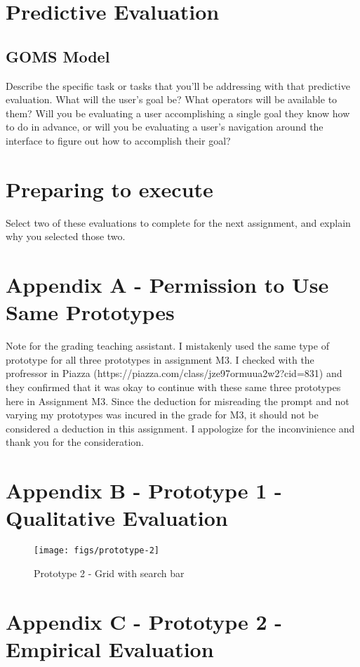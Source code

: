 \section{Predictive Evaluation}

\subsection{GOMS Model}
Describe the specific task or tasks that you’ll be addressing with that predictive evaluation. What will the user’s goal be? What operators will be available to them? Will you be evaluating a user accomplishing a single goal they know how to do in advance, or will you be evaluating a user’s navigation around the interface to figure out how to accomplish their goal?

\section{Preparing to execute}
Select two of these evaluations to complete for the next assignment, and explain why you selected those two.

\section{Appendix A - Permission to Use Same Prototypes}

Note for the grading teaching assistant. I mistakenly used the same type of prototype for all three prototypes in assignment M3. I checked with the profressor in Piazza (https://piazza.com/class/jze97ormuua2w2?cid=831) and they confirmed that it was okay to continue with these same three prototypes here in Assignment M3. Since the deduction for misreading the prompt and not varying my prototypes was incured in the grade for M3, it should not be considered a deduction in this assignment. I appologize for the inconvinience and thank you for the consideration.

\section{Appendix B - Prototype 1 - Qualitative Evaluation}

\begin{figure}[H]
  \centering
  \texttt{[image: figs/prototype-2]}
  \caption{Prototype 2 - Grid with search bar}
  \label{fig::1}
\end{figure}

\section{Appendix C - Prototype 2 - Empirical Evaluation}

